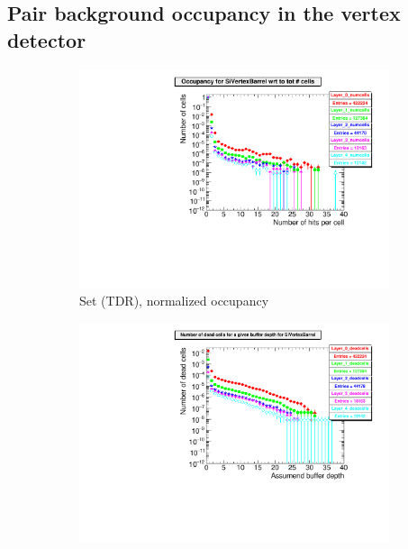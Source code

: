 \subsection{Pair background occupancy in the \sid vertex detector}
\begin{figure}[htbp]
 \centering
   \begin{subfigure}[b]{0.49\textwidth}
   \centering
    \includegraphics[width=\textwidth]{Figures/Pairs/Appendix/occupancy_numcells_SiVertexBarrel_ILC250_TDR_corrected_Barrel_size.pdf}
   \caption{Set (TDR), normalized occupancy}
   \end{subfigure}
   \hfill
    \begin{subfigure}[b]{0.49\textwidth}
   \centering
    \includegraphics[width=\textwidth]{Figures/Pairs/Appendix/occupancy_deadcells_SiVertexBarrel_ILC250_TDR_corrected_Barrel_size.pdf}

\end{subfigure}
\end{figure}
